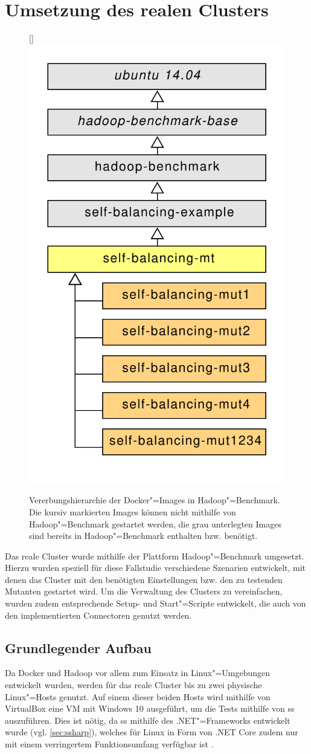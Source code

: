 \section{Umsetzung des realen Clusters}
\label{sec:realCluster}

\begin{figure}
    \raisebox{0pt}[\dimexpr{}\baselineskip\relax]
    {\includegraphics[width=0.4\columnwidth]
    {./resources/hadoopBenchDockerInherits.pdf}}
    \caption[Vererbungshierarchie der Docker"=Images in Hadoop"=Benchmark]
    {Vererbungshierarchie der Docker"=Images in Hadoop"=Benchmark.
    Die kursiv markierten Images können nicht mithilfe von Hadoop"=Benchmark gestartet werden, die grau unterlegten Images sind bereits in Hadoop"=Benchmark enthalten bzw. benötigt.}
    \label{fig:hadoopBenchDockerInherits}
\end{figure}

Das reale Cluster wurde mithilfe der Plattform Hadoop"=Benchmark umgesetzt.
Hierzu wurden speziell für diese Fallstudie verschiedene Szenarien entwickelt, mit denen das Cluster mit den benötigten Einstellungen bzw. den zu testenden Mutanten gestartet wird.
Um die Verwaltung des Clusters zu vereinfachen, wurden zudem entsprechende Setup- und Start"=Scripte entwickelt, die auch von den implementierten Connectoren genutzt werden.

\subsection{Grundlegender Aufbau}
\label{subsec:clusterBasics}

Da Docker und Hadoop vor allem zum Einsatz in Linux"=Umgebungen entwickelt wurden, werden für das reale Cluster bis zu zwei physische Linux"=Hosts genutzt.
Auf einem dieser beiden Hosts wird mithilfe von VirtualBox eine VM mit Windows 10 ausgeführt, um die Tests mithilfe von \gls{ss} auszuführen.
Dies ist nötig, da \gls{ss} mithilfe des .NET"=Frameworks entwickelt wurde (vgl. \cref{sec:ssharp}), welches für Linux in Form von .NET Core zudem nur mit einem verringertem Funktionsumfang verfügbar ist \cite{Schwichtenberg2017}.

